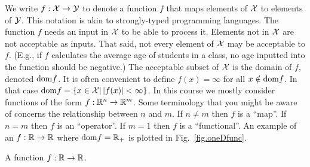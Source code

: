 We write $f: {\cal X} \rightarrow {\cal Y}$ to denote a function $f$ that
maps elements of ${\cal X}$ to elements of ${\cal Y}$.  This notation is
akin to strongly-typed programming languages.  The function $f$ needs
an input in ${\cal X}$ to be able to process it.  Elements not in ${\cal X}$
are not acceptable as inputs.  That said, not every element of ${\cal X}$
may be acceptable to $f$.  (E.g., if $f$ calculates the average age of
students in a class, no age inputted into the function should be
negative.)  The acceptable subset of ${\cal X}$ is the domain of $f$,
denoted ${\rm dom} f$.  It is often convenient to define $f(x)
= \infty$ for all $x \notin {\rm dom} f$.  In that case ${\rm dom} f
= \{x \in {\cal X} | \, |f(x)| < \infty\}$.  In this course we mostly
consider functions of the form $f : \mathbb{R}^n \rightarrow
\mathbb{R}^m$.  Some terminology that you might be aware of concerns the relationship
between $n$ and $m$.  If $n \neq m$ then $f$ is  a ``map''.
If $n = m$ then $f$ is an ``operator''.  If $m = 1$ then $f$ is a
``functional''.  An example of an $f: \mathbb{R} \rightarrow \mathbb{R}$ where ${\rm dom} f = \mathbb{R}_+$ is plotted in Fig.~\ref{fig.oneDfunc}.


\begin{marginfigure}
  \centering
  \resizebox{7.5cm}{3cm}{
  
  }
  \caption{A function $f: \mathbb{R} \rightarrow \mathbb{R}$.}
  \label{fig.oneDfunc}
\end{marginfigure}

